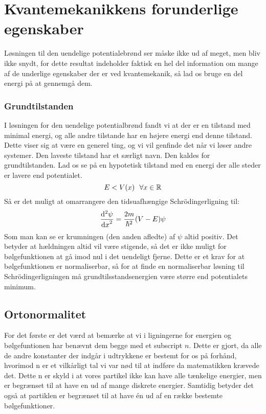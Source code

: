 \documentclass[../Kvantemekanik.tex]{subfiles}
\begin{document}
\section{Kvantemekanikkens forunderlige egenskaber}
Løsningen til den uendelige potentialebrønd ser måske ikke ud af meget, men bliv ikke snydt, for dette resultat indeholder faktisk en hel del information om mange af de underlige egenskaber der er ved kvantemekanik, så lad os bruge en del energi på at gennemgå dem.

\subsubsection{Grundtilstanden}
I løsningen for den uendelige potentialbrønd fandt vi at der er en tilstand med minimal energi, og alle andre tilstande har en højere energi end denne tilstand.
Dette viser sig at være en generel ting, og vi vil genfinde det når vi løser andre systemer.
Den laveste tilstand har et særligt navn. Den kaldes for grundtilstanden. 
Lad os se på en hypotetisk tilstand med en energi der alle steder er lavere end potentialet.
$$
E<V(x)~~\forall x\in \R
$$
Så er det muligt at omarrangere den tidsuafhængige Schrödingerligning til:
\begin{equation}
    \dif[2]{x}{\psi} = \frac{2m}{\hbar^2}(V-E)\psi
\end{equation}
Som man kan se er krumningen (den anden afledte) af $\psi$ altid positiv. Det betyder at hældningen altid vil være stigende, så det er ikke muligt for bølgefunktionen at gå imod nul i det uendeligt fjerne. Dette er et krav for at bølgefunktionen er normaliserbar, så for at finde en normaliserbar løsning til Schrödingerligningen må grundtilsstandsenergien være større end potentialets minimum.

\subsection{Ortonormalitet}
For det første er det værd at bemærke at vi i ligningerne for energien og bølgefuntionen har benævnt dem begge med et subscript $n$. Dette er gjort, da alle de andre konstanter der indgår i udtrykkene er bestemt for os på forhånd, hvorimod n er et vilkårligt tal vi var nød til at indføre da matematikken krævede det. Dette n er skyld i at vores partikel ikke kan have alle tænkelige energier, men er begrænset til at have en ud af mange diskrete energier. Samtidig betyder det også at partiklen er begrænset til at have én ud af en række bestemte bølgefunktioner.
\end{document}
